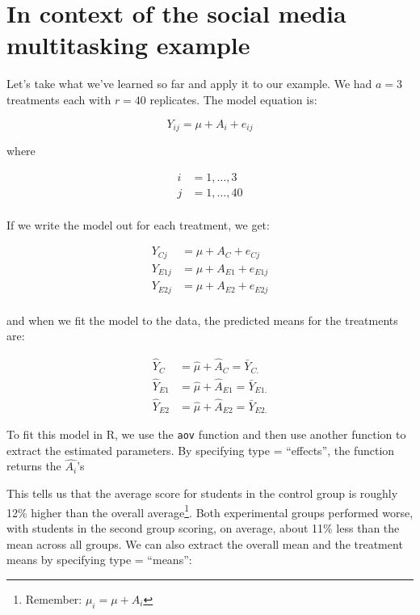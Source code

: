 \documentclass[
  letterpaper,
]{book}
\begin{document}
\section{In context of the social media multitasking
example}\label{in-context-of-the-social-media-multitasking-example}

Let's take what we've learned so far and apply it to our example. We had
\(a = 3\) treatments each with \(r=40\) replicates. The model equation
is:

\[ Y_{ij} = \mu + A_{i} + e_{ij}  \]

where

\[
\begin{aligned}
i & = 1, \dots, 3  \\
j & = 1, \dots, 40 \\
\end{aligned}
\]

If we write the model out for each treatment, we get:

\[
\begin{aligned}
Y_{Cj} &= \mu + A_C + e_{Cj} \\ 
Y_{E1j} &= \mu + A_{E1} + e_{E1j} \\ 
Y_{E2j} &= \mu + A_{E2} + e_{E2j} \\
\end{aligned}
\]

and when we fit the model to the data, the predicted means for the
treatments are:

\[
\begin{aligned}
\hat{Y}_{C} &= \hat{\mu} + \hat{A}_C = \bar{Y}_{C.}\\ 
\hat{Y}_{E1} &= \hat{\mu} + \hat{A}_{E1} = \bar{Y}_{E1.}\\ 
\hat{Y}_{E2} &= \hat{\mu} + \hat{A}_{E2} = \bar{Y}_{E2.}
\end{aligned}
\]

To fit this model in R, we use the \texttt{aov} function and then use
another function to extract the estimated parameters. By specifying type
= ``effects'', the function returns the \(\hat{A_i}\)'s

This tells us that the average score for students in the control group
is roughly 12\% higher than the overall average\footnote{Remember:
  \(\mu_i = \mu + A_i\)}. Both experimental groups performed worse, with
students in the second group scoring, on average, about 11\% less than
the mean across all groups. We can also extract the overall mean and the
treatment means by specifying type = ``means'':
\end{document}
